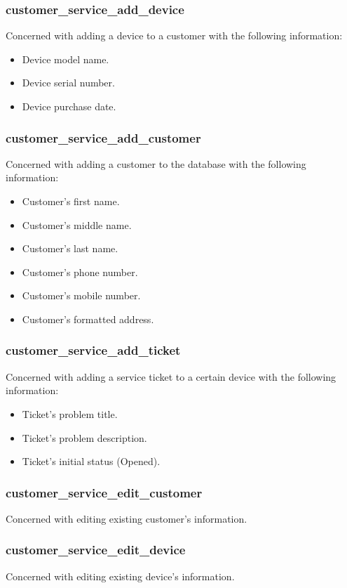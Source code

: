 	\subsubsection{customer\_service\_add\_device}
		Concerned with adding a device to a customer with the following information:
		\begin{itemize}
			\item Device model name.
			\item Device serial number.
			\item Device purchase date.
		\end{itemize}
	\subsubsection{customer\_service\_add\_customer}
		Concerned with adding a customer to the database with the following information:
		\begin{itemize}
			\item Customer's first name.
			\item Customer's middle name.
			\item Customer's last name.
			\item Customer's phone number.
			\item Customer's mobile number.
			\item Customer's formatted address.
		\end{itemize}
	\subsubsection{customer\_service\_add\_ticket}
		Concerned with adding a service ticket to a certain device with the following information:
		\begin{itemize}
			\item Ticket's problem title.
			\item Ticket's problem description.
			\item Ticket's initial status (Opened).
		\end{itemize}
	\subsubsection{customer\_service\_edit\_customer}
		Concerned with editing existing customer's information.
	\subsubsection{customer\_service\_edit\_device}
		Concerned with editing existing device's information.
